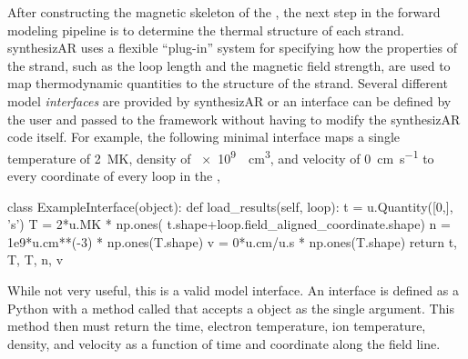 After constructing the magnetic skeleton of the \AR{}, the next step in the forward modeling pipeline is to determine the thermal structure of each strand. synthesizAR uses a flexible ``plug-in'' system for specifying how the properties of the strand, such as the loop length and the magnetic field strength, are used to map thermodynamic quantities to the structure of the strand. Several different model \textit{interfaces} are provided by synthesizAR or an interface can be defined by the user and passed to the framework without having to modify the synthesizAR code itself. For example, the following minimal interface maps a single temperature of \SI{2}{\mega\kelvin}, density of \SI{e9}{\per\cubic\cm}, and velocity of \SI{0}{\cm\per\second} to every coordinate of every loop in the \AR{},
\begin{pyblock}[][baselinestretch=1,xleftmargin=3em]
class ExampleInterface(object):
    def load_results(self, loop):
        t = u.Quantity([0,], 's')
        T = 2*u.MK * np.ones(
            t.shape+loop.field_aligned_coordinate.shape)
        n = 1e9*u.cm**(-3) * np.ones(T.shape)
        v = 0*u.cm/u.s * np.ones(T.shape)
        return t, T, T, n, v
\end{pyblock}
While not very useful, this is a valid model interface. An interface is defined as a Python  with a method called  that accepts a  object as the single argument. This method then must return the time, electron temperature, ion temperature, density, and velocity as a function of time and coordinate along the field line.

